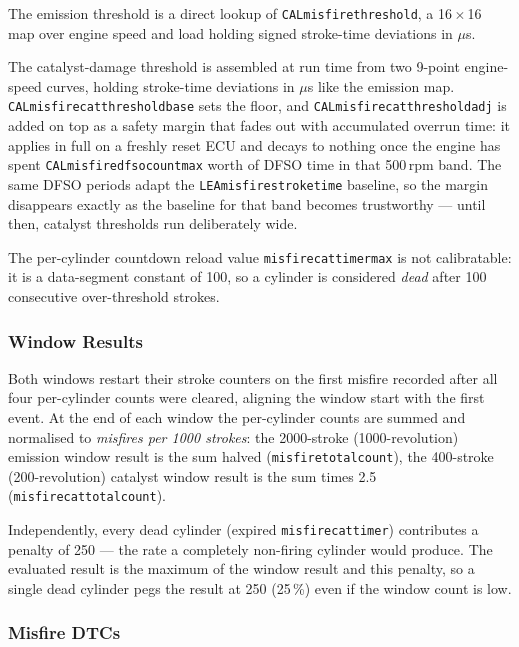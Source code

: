 \documentclass[a4paper,11pt]{article}
\renewcommand{\_}{\oldunderscore\allowbreak}
\begin{document}
The emission threshold is a direct lookup of \texttt{CAL\_misfire\_threshold},
a 16\,$\times$\,16 map over engine speed and load holding signed stroke-time
deviations in $\mu$s.

The catalyst-damage threshold is assembled at run time from two 9-point
engine-speed curves, holding stroke-time deviations in $\mu$s like the
emission map. \texttt{CAL\_misfire\_cat\_threshold\_base} sets the floor, and \texttt{CAL\_misfire\_cat\_threshold\_adj} is added on top as a
safety margin that fades out with accumulated overrun time: it applies in full
on a freshly reset ECU and decays to nothing once the engine has spent
\texttt{CAL\_misfire\_dfso\_count\_max} worth of DFSO time in that 500\,rpm
band. The same DFSO periods adapt the \texttt{LEA\_misfire\_stroke\_time}
baseline, so the margin disappears exactly as the baseline for that band
becomes trustworthy --- until then, catalyst thresholds run deliberately wide.

The per-cylinder countdown reload value \texttt{misfire\_cat\_timer\_max} is
not calibratable: it is a data-segment constant of 100, so a cylinder is
considered \emph{dead} after 100 consecutive over-threshold strokes.

\subsubsection*{Window Results}

Both windows restart their stroke counters on the first misfire recorded
after all four per-cylinder counts were cleared, aligning the window start
with the first event. At the end of each window the per-cylinder counts are
summed and normalised to \emph{misfires per 1000 strokes}: the 2000-stroke
(1000-revolution) emission window result is the sum halved
(\texttt{misfire\_total\_count}), the 400-stroke (200-revolution) catalyst
window result is the sum times 2.5 (\texttt{misfire\_cat\_total\_count}).

Independently, every dead cylinder (expired \texttt{misfire\_cat\_timer})
contributes a penalty of 250 --- the rate a completely non-firing cylinder
would produce. The evaluated result is the maximum of the window result and
this penalty, so a single dead cylinder pegs the result at 250 (25\,\%) even
if the window count is low.

\subsubsection*{Misfire DTCs}
\end{document}
